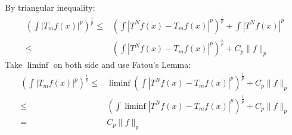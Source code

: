 \documentclass{report}
\theoremstyle{definition}
\theoremstyle{definition}
\theoremstyle{plain}
\numberwithin{theorem}{subsection}
\numberwithin{remark}{subsection}
\newcommand{\norm}[1]{\lVert#1\rVert}
\newcommand{\abs}[1]{\left\lvert#1\right\rvert}
\begin{document}
By triangular inequality:
\begin{align*}
    (\int\abs{T_m f(x)}^p)^\frac{1}{p} \leq & (\int\abs{T^N f(x)-T_mf(x)}^p)^\frac{1}{p}+\int\abs{T^N f(x)}^p \\
    \leq                                    & (\int\abs{T^N f(x)-T_mf(x)}^p)^\frac{1}{p}+C_p\norm{f}_p
\end{align*}
Take $\liminf$ on both side and use Fatou's Lemma:
\begin{align*}
    (\int\abs{T_m f(x)}^p)^\frac{1}{p}\leq & \liminf(\int\abs{T^N f(x)-T_mf(x)}^p)^\frac{1}{p}+C_p\norm{f}_p \\
    \leq                                   & (\int\liminf\abs{T^N f(x)-T_mf(x)}^p)^\frac{1}{p}+C_p\norm{f}_p \\
    =                                      & C_p\norm{f}_p
\end{align*}
\end{document}
